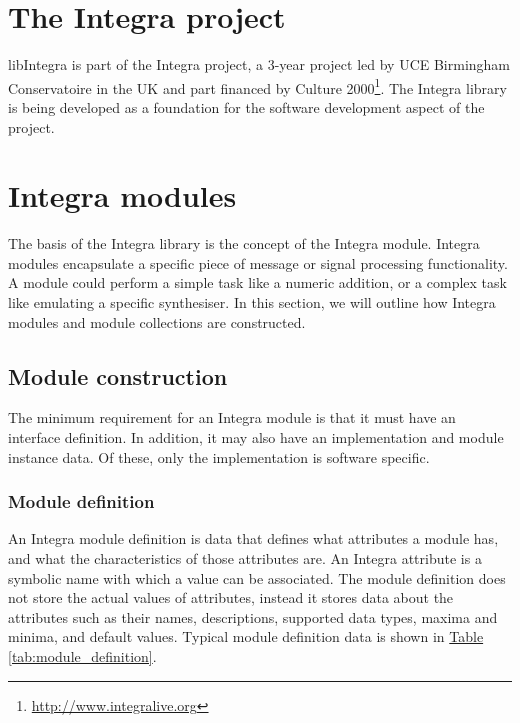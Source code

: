 \section{The Integra project}\label{sec:integra_introduction}

libIntegra is part of the Integra project, a 3-year project led by UCE Birmingham Conservatoire in the UK and part financed by Culture 2000\footnote{\url{http://www.integralive.org}}. The Integra library is being developed as a foundation for the software development aspect of the project. 

\section{Integra modules}\label{sec:modules}

The basis of the Integra library is the concept of the Integra module. Integra modules encapsulate a specific piece of message or signal processing functionality. A module could perform a simple task like a numeric addition, or a complex task like emulating a specific synthesiser. In this section, we will outline how Integra modules and module collections are constructed.

\subsection{Module construction}\label{subsec:module_construction}

The minimum requirement for an Integra module is that it must have an interface definition. In addition, it may also have an implementation and module instance data. Of these, only the implementation is software specific.

\subsubsection{Module definition}\label{subsubsec:module_definition}

An Integra module definition is data that defines what attributes a
module has, and what the characteristics of those attributes are. An
Integra attribute is a symbolic name with which a value can be
associated. The module definition does not store the actual values of
attributes, instead it stores data about the attributes such as their
names, descriptions, supported data types, maxima and minima, and
default values. Typical module definition data is shown in \hyperref[tab:module_definition]{Table
\ref*{tab:module_definition}}.

